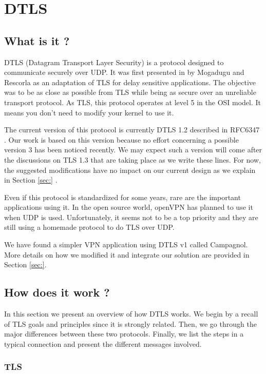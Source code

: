 \chapter{DTLS}

\section{What is it ?}

DTLS (Datagram Transport Layer Security) is a protocol designed to communicate securely over UDP. It was first presented in \cite{modadugu2004design} by Mogadugu and Rescorla as an adaptation of TLS for delay sensitive applications. The objective was to be as close as possible from TLS while being as secure over an unreliable transport protocol. As TLS, this protocol operates at level 5 in the OSI model. It means you don't need to modify your kernel to use it.

The current version of this protocol is currently DTLS 1.2 described in RFC6347 \cite{rfc6347}. Our work is based on this version because no effort concerning a possible version 3 has been noticed recently. We may expect such a version will come after the discussions on TLS 1.3 that are taking place as we write these lines. For now, the suggested modifications have no impact on our current design as we explain in Section \ref{sec:} .

Even if this protocol is standardized for some years, rare are the important applications using it. In the open source world, openVPN has planned to use it when UDP is used. Unfortunately, it seems not to be a top priority and they are still using a homemade protocol to do TLS over UDP.

We have found a simpler VPN application using DTLS v1 called Campagnol. More details on how we modified it and integrate our solution are provided in Section \ref{sec:}.

\section{How does it work ?}

In this section we present an overview of how DTLS works. We begin by a recall of TLS goals and principles since it is strongly related. Then, we go through the major differences between these two protocols. Finally, we list the steps in a typical connection and present the different messages involved. 

\subsection{TLS}

